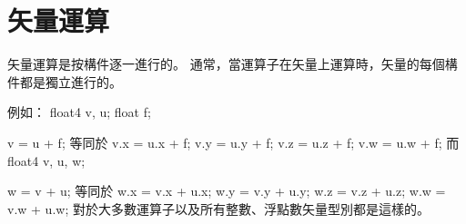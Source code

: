 \section{矢量運算}

矢量運算是按構件逐一進行的。
通常，當運算子在矢量上運算時，矢量的每個構件都是獨立進行的。

例如：
\startclc
float4	v, u;
float	f;

v = u + f;
\stopclc
等同於
\startclc
v.x = u.x + f;
v.y = u.y + f;
v.z = u.z + f;
v.w = u.w + f;
\stopclc
而
\startclc
float4	v, u, w;

w = v + u;
\stopclc
等同於
\startclc
w.x = v.x + u.x;
w.y = v.y + u.y;
w.z = v.z + u.z;
w.w = v.w + u.w;
\stopclc
對於大多數運算子以及所有整數、浮點數矢量型別都是這樣的。

